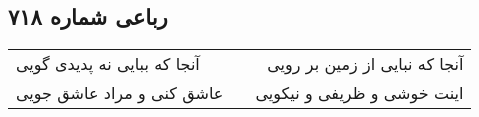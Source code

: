 \begin{center}
\section*{رباعی شماره ۷۱۸}
\label{sec:sh718}
\begin{longtable}{l p{0.5cm} r}
آنجا که ببایی نه پدیدی گویی
&&
آنجا که نبایی از زمین بر رویی
\\
عاشق کنی و مراد عاشق جویی
&&
اینت خوشی و ظریفی و نیکویی
\\
\end{longtable}
\end{center}
